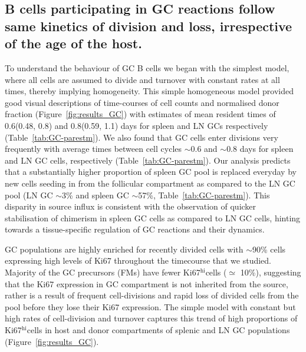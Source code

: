 \documentclass[11pt]{article}
\newcommand{\khi}{Ki67$^\text{hi}$}
\begin{document}
	\subsection*{B cells participating in GC reactions follow same kinetics of division and loss, irrespective of the age of the host.}
	To understand the behaviour of GC B cells we began with the simplest model, where all cells are assumed to divide and turnover with constant rates at all times, thereby implying homogeneity.
	This simple homogeneous model provided good visual descriptions of time-courses of cell counts and normalised donor fraction (Figure~\ref{fig:results_GC}) with estimates of mean resident times of 0.6(0.48, 0.8) and 0.8(0.59, 1.1) days for spleen and LN GCs respectively (Table~\ref{tab:GC-parestm}).
	We also found that GC cells enter divisions very frequently with average times between cell cycles $\sim$0.6 and $\sim$0.8 days for spleen and LN GC cells, respectively (Table~\ref{tab:GC-parestm}).
	Our analysis predicts that a substantially higher proportion of spleen GC pool is replaced everyday by new cells seeding in from the follicular compartment as compared to the LN GC pool (LN GC $\sim$3\% and spleen GC $\sim$57\%, Table~\ref{tab:GC-parestm}).
	This disparity in source influx is consistent with the observation of quicker stabilisation of chimerism in spleen GC cells as compared to LN GC cells, hinting towards a tissue-specific regulation of GC reactions and their dynamics. 
	
	GC populations are highly enriched for recently divided cells with $\sim$90\% cells expressing high levels of Ki67 throughout the timecourse that we studied.
	Majority of the GC precursors (FMs) have fewer \khi cells ($\simeq$ 10\%), suggesting that the Ki67 expression in GC compartment is not inherited from the source, rather is a result of frequent cell-divisions and rapid loss of divided cells from the pool before they lose their Ki67 expression.
	The simple model with constant but high rates of cell-division and turnover captures this trend of high proportions of \khi cells in host and donor compartments of splenic and LN GC populations (Figure~\ref{fig:results_GC}). 
	
\end{document}
